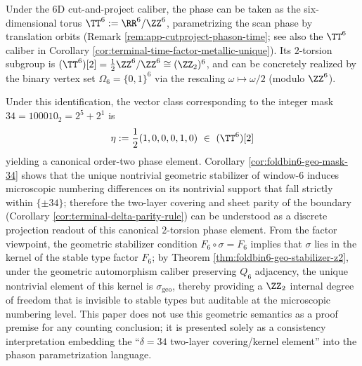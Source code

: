 \begin{remark}[Phason \texorpdfstring{$2$}{2}-Torsion Interpretation of \texorpdfstring{$\delta=34$}{delta=34} (as Geometric Semantics)]\label{rem:bdry-delta34-phason-2torsion}
Under the 6D cut-and-project caliber, the phase can be taken as the six-dimensional torus \(\TT^6:=\RR^6/\ZZ^6\), parametrizing the scan phase by translation orbits (Remark \ref{rem:app-cutproject-phason-time}; see also the \(\TT^6\) caliber in Corollary \ref{cor:terminal-time-factor-metallic-unique}).
Its \(2\)-torsion subgroup is
\(
(\TT^6)[2]=\frac12\ZZ^6/\ZZ^6\cong (\ZZ_2)^6
\), and can be concretely realized by the binary vertex set \(\Omega_6=\{0,1\}^6\) via the rescaling \(\omega\mapsto \omega/2\) (modulo \(\ZZ^6\)).
\par
Under this identification, the vector class corresponding to the integer mask \(34=100010_2=2^5+2^1\) is
\[
\eta:=\frac12(1,0,0,0,1,0)\ \in\ (\TT^6)[2]
\]
yielding a canonical order-two phase element.
Corollary \ref{cor:foldbin6-geo-mask-34} shows that the unique nontrivial geometric stabilizer of window-\(6\) induces microscopic numbering differences on its nontrivial support that fall strictly within \(\{\pm 34\}\);
therefore the two-layer covering and sheet parity of the boundary (Corollary \ref{cor:terminal-delta-parity-rule}) can be understood as a discrete projection readout of this canonical \(2\)-torsion phase element.
From the factor viewpoint, the geometric stabilizer condition \(F_6\circ\sigma=F_6\) implies that \(\sigma\) lies in the kernel of the stable type factor \(F_6\); by Theorem \ref{thm:foldbin6-geo-stabilizer-z2}, under the geometric automorphism caliber preserving \(Q_6\) adjacency, the unique nontrivial element of this kernel is \(\sigma_{\mathrm{geo}}\), thereby providing a \(\ZZ_2\) internal degree of freedom that is invisible to stable types but auditable at the microscopic numbering level.
This paper does not use this geometric semantics as a proof premise for any counting conclusion; it is presented solely as a consistency interpretation embedding the ``\(\delta=34\) two-layer covering/kernel element'' into the phason parametrization language.
\end{remark}

